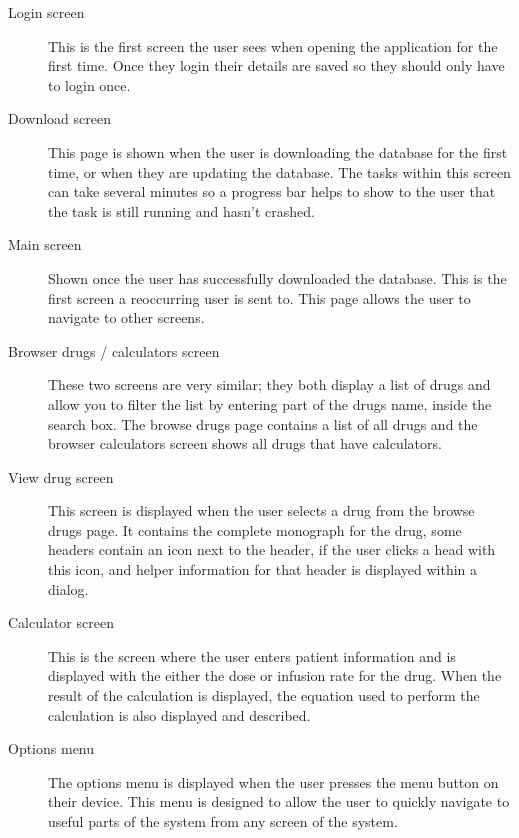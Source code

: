 \begin{description}
	\item[Login screen]
	This is the first screen the user sees when opening the application for the first time. Once they login their details are saved so they should only have to login once.
	\item[Download screen]
	This page is shown when the user is downloading the database for the first time, or when they are updating the database. The tasks within this screen can take several minutes so a progress bar helps to show to the user that the task is still running and hasn’t crashed.
	\item[Main screen]
	Shown once the user has successfully downloaded the database. This is the first screen a reoccurring user is sent to. This page allows the user to navigate to other screens.
	\item[Browser drugs / calculators screen]
	These two screens are very similar; they both display a list of drugs and allow you to filter the list by entering part of the drugs name, inside the search box. The browse drugs page contains a list of all drugs and the browser calculators screen shows all drugs that have calculators.
	\item[View drug screen]
	This screen is displayed when the user selects a drug from the browse drugs page. It contains the complete monograph for the drug, some headers contain an icon next to the header, if the user clicks a head with this icon, and helper information for that header is displayed within a dialog.
	\item[Calculator screen]
	This is the screen where the user enters patient information and is displayed with the either the dose or infusion rate for the drug. When the result of the calculation is displayed, the equation used to perform the calculation is also displayed and described.
	\item[Options menu]
	The options menu is displayed when the user presses the menu button on their device. This menu is designed to allow the user to quickly navigate to useful parts of the system from any screen of the system.
\end{description}



